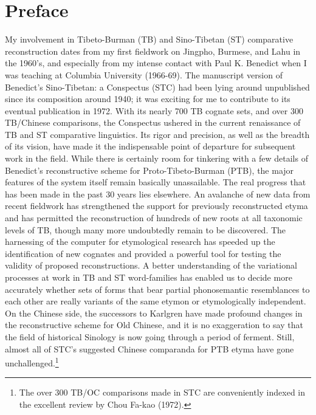 \vspace{0.25em}

\renewcommand{\thefootnote}{\arabic{footnote}}
\setcounter{footnote}{0}

\chapter*{Preface}

My involvement in Tibeto-Burman (TB) and Sino-Tibetan (ST) comparative reconstruction dates from my first fieldwork on Jingpho, Burmese, and Lahu in the 1960's, and especially from my intense contact with Paul K. Benedict when I was teaching at Columbia University (1966-69). The manuscript version of Benedict's Sino-Tibetan: a Conspectus (STC) had been lying around unpublished since its composition around 1940; it was exciting for me to contribute to its eventual publication in 1972. With its nearly 700 TB cognate sets, and over 300 TB/Chinese comparisons, the Conspectus ushered in the current renaissance of TB and ST comparative linguistics. Its rigor and precision, as well as the breadth of its vision, have made it the indispensable point of departure for subsequent work in the field. While there is certainly room for tinkering with a few details of Benedict's reconstructive scheme for Proto-Tibeto-Burman (PTB), the major features of the system itself remain basically unassailable. The real progress that has been made in the past 30 years lies elsewhere. An avalanche of new data from recent fieldwork has strengthened the support for previously reconstructed etyma and has permitted the reconstruction of hundreds of new roots at all taxonomic levels of TB, though many more undoubtedly remain to be discovered. The harnessing of the computer for etymological research has speeded up the identification of new cognates and provided a powerful tool for testing the validity of proposed reconstructions. A better understanding of the variational processes at work in TB and ST word-families has enabled us to decide more accurately whether sets of forms that bear partial phonosemantic resemblances to each other are really variants of the same etymon or etymologically independent. On the Chinese side, the successors to Karlgren have made profound changes in the reconstructive scheme for Old Chinese, and it is no exaggeration to say that the field of historical Sinology is now going through a period of ferment. Still, almost all of STC's suggested Chinese comparanda for PTB etyma have gone unchallenged.\footnote{The over 300 TB/OC comparisons made in STC are conveniently indexed in the excellent review by Chou Fa-kao (1972).}

